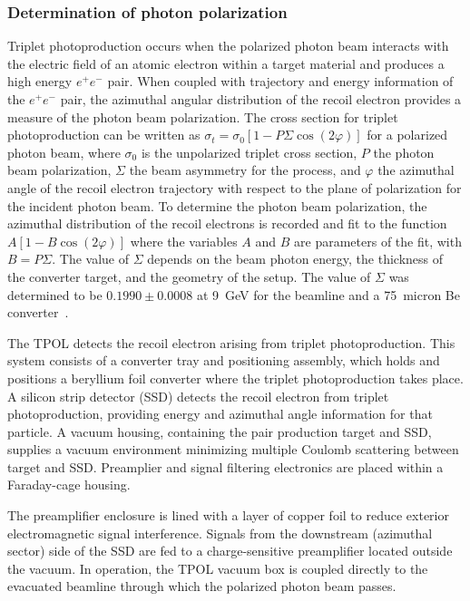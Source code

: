 \subsubsection{Determination of photon polarization \label{sec:polarization}}
Triplet photoproduction occurs when the polarized photon beam interacts
with the electric field of an atomic electron within a target material
and produces a high energy $e^+e^-$ pair. When coupled with
trajectory and energy information of the $e^+e^-$ pair, the azimuthal
angular distribution of the recoil electron provides a measure of
the photon beam polarization. The cross section for triplet photoproduction
can be written as $\sigma_t = \sigma_0 [ 1 - P \Sigma \cos(2\varphi)]$
for a polarized photon beam, where $\sigma_0$ is the unpolarized triplet
cross section, $P$ the photon beam polarization, $\Sigma$ the beam
asymmetry for the process, and $\varphi$ the azimuthal angle of the
recoil electron trajectory with respect to the plane of polarization
for the incident photon beam. To determine the photon beam polarization,
the azimuthal distribution of the recoil electrons is recorded and fit
to the function $A [ 1- B \cos(2\varphi)]$  where the variables $A$ and
$B$ are parameters of the fit, with $B = P \Sigma$. The value of
$\Sigma$ depends on the beam photon energy, the
thickness of the converter target, and the geometry of the setup.
The value of $\Sigma$ was determined to be $0.1990 \pm 0.0008$ at 9~GeV for the \GX{} beamline
and a 75~micron Be converter~\cite{DUGGER2017115}.

The TPOL detects the recoil electron arising
from triplet photoproduction. 
This system consists of a converter tray and positioning assembly, which holds
and positions a beryllium foil converter where the triplet photoproduction
takes place.  A silicon strip detector (SSD) detects the recoil electron
from triplet photoproduction, providing energy and azimuthal angle information
for that particle. A vacuum housing, containing the pair production target and
SSD, supplies a vacuum environment minimizing multiple Coulomb scattering
between target and SSD. Preamplier and signal filtering electronics are placed
within a Faraday-cage housing.

The preamplifier enclosure is lined with a layer of copper foil to reduce exterior electromagnetic signal interference.
Signals from the downstream (azimuthal sector) side of the SSD are fed to a charge-sensitive preamplifier located outside the vacuum.
In operation, the TPOL vacuum box is coupled directly to the evacuated
beamline through which the polarized photon beam passes. 

